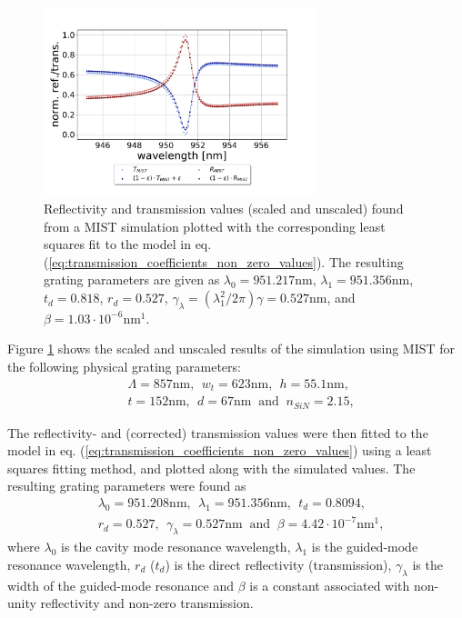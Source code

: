 \begin{figure}[h!]
    \centering
    \includegraphics[width=0.7\textwidth]{figures/MIST_grating_sim.pdf}
    \caption{Reflectivity and transmission values (scaled and unscaled) found from a MIST simulation plotted with the corresponding least squares fit to the model in eq. (\ref{eq:transmission_coefficients_non_zero_values}). The resulting grating parameters are given as $\lambda_0 = 951.217$nm, $\lambda_1 = 951.356$nm, $t_d = 0.818$, $r_d = 0.527$, $\gamma_{\lambda} = \left( \lambda_1^2/2 \pi \right) \gamma = 0.527$nm, and $\beta = 1.03 \cdot 10^{-6}$nm$^1$.}
    \label{fig:MIST_sim_of_grating}
\end{figure}

Figure \ref{fig:MIST_sim_of_grating} shows the scaled and unscaled results of the simulation using MIST for the following physical grating parameters:
\begin{equation}
    \begin{split}
    &\Lambda = 857 \text{nm},\:\: w_t = 623 \text{nm},\:\: h = 55.1 \text{nm},\\ &t = 152 \text{nm},\:\: d = 67 \text{nm}\: \text{ and }\: n_{SiN} = 2.15,
    \end{split}
    \label{eq:physical_grating_params}
\end{equation}

The reflectivity- and (corrected) transmission values were then fitted to the model in eq. (\ref{eq:transmission_coefficients_non_zero_values}) using a least squares fitting method, and plotted along with the simulated values. The resulting grating parameters were found as
\begin{equation}
    \begin{split}
    &\lambda_0 = 951.208 \text{nm},\:\: \lambda_1 = 951.356 \text{nm},\:\: t_d = 0.8094,\\ &r_d = 0.527,\:\: \gamma_{\lambda} = 0.527 \text{nm}\: \text{ and }\: \beta = 4.42 \cdot 10^{-7}\text{nm}^1,
    \end{split}
    \label{eq:optical_grating_params}
\end{equation}
where $\lambda_0$ is the cavity mode resonance wavelength, $\lambda_1$ is the guided-mode resonance wavelength, $r_d$ ($t_d$) is the direct reflectivity (transmission), $\gamma_{\lambda}$ is the width of the guided-mode resonance and $\beta$ is a constant associated with non-unity reflectivity and non-zero transmission. 

